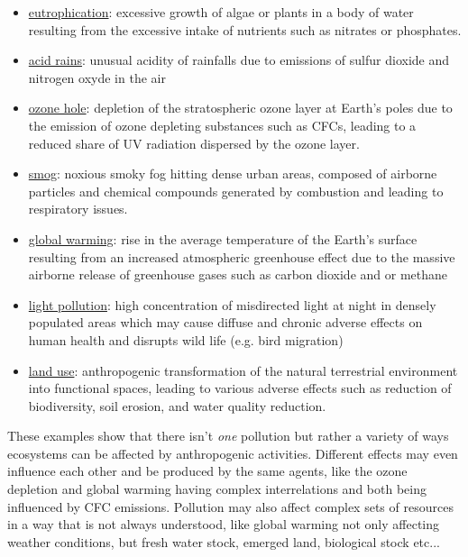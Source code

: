 \documentclass{article}
\begin{document}
\begin{itemize} %
	\item \href{https://en.wikipedia.org/wiki/Eutrophication}{eutrophication}: excessive growth of algae or plants in a body of water resulting from the excessive intake of nutrients such as nitrates or phosphates.
	\item \href{https://en.wikipedia.org/wiki/Acid_rain}{acid rains}: unusual acidity of rainfalls due to emissions of sulfur dioxide and nitrogen oxyde in the air
	\item \href{https://en.wikipedia.org/wiki/Ozone_depletion}{ozone hole}: depletion of the stratospheric ozone layer at Earth's poles due to the emission of ozone depleting substances such as CFCs, leading to a reduced share of UV radiation dispersed by the ozone layer. 
	\item \href{https://en.wikipedia.org/wiki/Smog}{smog}: noxious smoky fog hitting dense urban areas, composed of airborne particles and chemical compounds generated by combustion and leading to respiratory issues. 
	\item \href{https://en.wikipedia.org/wiki/Global_warming}{global warming}: rise in the average temperature of the Earth's surface resulting from an increased atmospheric greenhouse effect due to the massive airborne release of greenhouse gases such as carbon dioxide and or methane
	\item \href{https://en.wikipedia.org/wiki/Light_pollution}{light pollution}: high concentration of misdirected light at night in densely populated areas which may cause diffuse and chronic adverse effects on human health and disrupts wild life (e.g. bird migration) 
	\item \href{https://en.wikipedia.org/wiki/Land_use}{land use}: anthropogenic transformation of the natural terrestrial environment into functional spaces, leading to various adverse effects such as reduction of biodiversity, soil erosion, and water quality reduction. 
\end{itemize}
These examples show that there isn't \emph{one} pollution but rather a variety of ways ecosystems can be affected by anthropogenic activities. Different effects may even influence each other and be produced by the same agents, like the ozone depletion and global warming having complex interrelations and both being influenced by CFC emissions. Pollution may also affect complex sets of resources in a way that is not always understood, like global warming not only affecting weather conditions, but fresh water stock, emerged land, biological stock etc...
\end{document}
